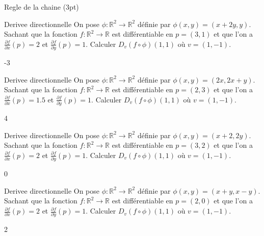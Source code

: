 \documentclass[12pt]{article}
\begin{document}
\begin{quiz}[points=3]
  {Regle de la chaine (3pt)}

  \begin{numerical}{Derivee directionnelle}
    On pose $\phi: \mathbb R^2 \to \mathbb R^2$ d\'{e}finie par $\phi(x,y) = (x+2y, y)$. Sachant que la fonction $f:\mathbb R^2 \to \mathbb R$ est diff\'{e}rentiable en $p=(3,1)$ et que l'on a $\frac{\partial f}{\partial x}(p) = 2$ et $\frac{\partial f}{\partial y}(p) = 1$. Calculer $D_v (f \circ \phi)(1,1)$ o\`{u} $v=(1,-1)$.
  \item -3
  \end{numerical}

  \begin{numerical}{Derivee directionnelle}
    On pose $\phi: \mathbb R^2 \to \mathbb R^2$ d\'{e}finie par $\phi(x,y) = (2x, 2x+y)$. Sachant que la fonction $f:\mathbb R^2 \to \mathbb R$ est diff\'{e}rentiable en $p=(2,3)$ et que l'on a $\frac{\partial f}{\partial x}(p) = 1.5$ et  $\frac{\partial f}{\partial y}(p) = 1$. Calculer $D_v (f \circ \phi)(1,1)$ o\`{u} $v=(1,-1)$.
  \item 4
  \end{numerical}

  \begin{numerical}{Derivee directionnelle}
    On pose $\phi: \mathbb R^2 \to \mathbb R^2$ d\'{e}finie par $\phi(x,y) = (x+2, 2y)$. Sachant que la fonction $f:\mathbb R^2 \to \mathbb R$ est diff\'{e}rentiable en $p=(3,2)$ et que l'on a $\frac{\partial f}{\partial x}(p) = 2$ et  $\frac{\partial f}{\partial y}(p) = 1$. Calculer $D_v (f \circ \phi)(1,1)$ o\`{u} $v=(1,-1)$.
  \item 0
  \end{numerical}

  \begin{numerical}{Derivee directionnelle}
    On pose $\phi: \mathbb R^2 \to \mathbb R^2$ d\'{e}finie par $\phi(x,y) = (x+y, x-y)$. Sachant que la fonction $f:\mathbb R^2 \to \mathbb R$ est diff\'{e}rentiable en $p=(2,0)$ et que l'on a $\frac{\partial f}{\partial x}(p) = 2$ et  $\frac{\partial f}{\partial y}(p) = 1$. Calculer $D_v (f \circ \phi)(1,1)$ o\`{u} $v=(1,-1)$.
  \item 2
  \end{numerical}
\end{quiz}
\end{document}

